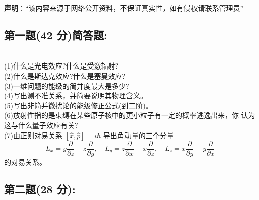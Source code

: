 
\textbf{声明}：“该内容来源于网络公开资料，不保证真实性，如有侵权请联系管理员”

\subsection{第一题(42 分)简答题:}\\
(1)什么是光电效应?什么是受激辐射?\\
(2)什么是斯达克效应?什么是塞曼效应?\\
(3)一维问题的能级的简并度最大是多少?\\
(4)写出测不准关系，并简要说明其物理含义。\\
(5)写出非简并微扰论的能级修正公式(到二阶)。\\
(6)放射性指的是束缚在某些原子核中的更小粒子有一定的概率逃逸出来，你
认为这与什么量子效应有关?\\
(7)由正则对易关系 $[\hat{x}, \hat{p}] = i\hbar$ 导出角动量的三个分量
\[
L_x = y \frac{\partial}{\partial z} - z \frac{\partial}{\partial y}, \quad 
L_y = z \frac{\partial}{\partial x} - x \frac{\partial}{\partial z}, \quad 
L_z = x \frac{\partial}{\partial y} - y \frac{\partial}{\partial x}~
\]
的对易关系。

\subsection{第二题(28 分):}
